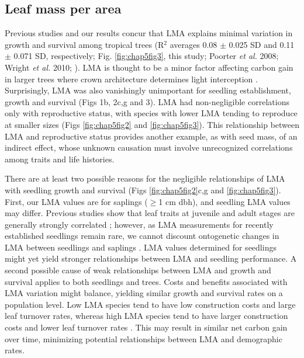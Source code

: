 \documentclass[b5paper,justified]{tufte-book} %
\begin{document}
\begin{fullwidth}
\subsection{Leaf mass per area}
Previous studies and our results concur that LMA explains minimal variation in growth and survival among tropical
trees (R$^2$ averages 0.08 $\pm$ 0.025 SD and 0.11 $\pm$ 0.071 SD, respectively; Fig. \ref{fig:chap5fig3}, this study; Poorter \emph{et al.} 2008; Wright \emph{et al.} 2010; \citealt{Iida2014a}). LMA is thought to be a minor factor affecting carbon gain in larger trees where crown architecture determines light interception \citep{Sterck2001}. Surprisingly, LMA was also vanishingly unimportant for seedling establishment, growth and survival (Figs 1b, 2c,g and 3). LMA had non-negligible correlations only with reproductive status, with species with lower LMA tending to reproduce at smaller sizes (Figs \ref{fig:chap5fig2} and \ref{fig:chap5fig3}). This relationship between LMA and reproductive status provides another example, as with seed mass, of an indirect effect, whose unknown causation must involve unrecognized correlations among traits and life histories.

There are at least two possible reasons for the negligible relationships of LMA with seedling growth and survival
(Figs \ref{fig:chap5fig2}c,g and \ref{fig:chap5fig3}). First, our LMA values are for saplings ($\geq$1 cm dbh), and seedling LMA values may differ. Previous studies show that leaf traits at juvenile and adult stages are generally strongly correlated \citep{Iida2014}; however, as LMA measurements for recently established seedlings remain rare, we cannot discount ontogenetic changes in LMA between seedlings and saplings \citep{Spasojevic2014}. LMA values determined for seedlings might yet yield stronger relationships between LMA and seedling performance. A second possible cause of weak relationships between LMA and growth and survival applies to both seedlings and trees. Costs and benefits associated with LMA variation might balance, yielding similar growth and survival rates on a population level. Low LMA species tend to have low construction costs and large leaf turnover rates, whereas high LMA species tend to have larger construction costs and lower leaf turnover rates \citep{Wright2004}. This may result in similar net carbon gain over time, minimizing potential relationships between LMA and demographic rates.


\end{fullwidth}
\end{document}
